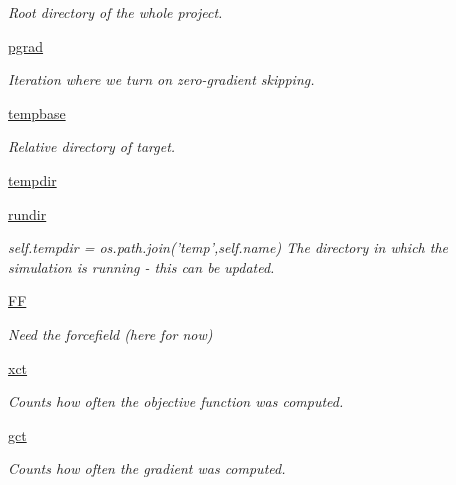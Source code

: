 \begin{DoxyCompactItemize}
\begin{DoxyCompactList}\small\item\em Root directory of the whole project. \end{DoxyCompactList}\item 
\hyperlink{classforcebalance_1_1target_1_1Target_a684235b4332b608c4e2da22982c2fdfa}{pgrad}
\begin{DoxyCompactList}\small\item\em Iteration where we turn on zero-\/gradient skipping. \end{DoxyCompactList}\item 
\hyperlink{classforcebalance_1_1target_1_1Target_ae5b544d3e11365865813ef3d626ef81d}{tempbase}
\begin{DoxyCompactList}\small\item\em Relative directory of target. \end{DoxyCompactList}\item 
\hyperlink{classforcebalance_1_1target_1_1Target_aa1f01b5b78db253b5b66384ed11ed193}{tempdir}
\item 
\hyperlink{classforcebalance_1_1target_1_1Target_a6872de5b2d4273b82336ea5b0da29c9e}{rundir}
\begin{DoxyCompactList}\small\item\em self.\-tempdir = os.\-path.\-join('temp',self.\-name) The directory in which the simulation is running -\/ this can be updated. \end{DoxyCompactList}\item 
\hyperlink{classforcebalance_1_1target_1_1Target_a38a37919783141ea37fdcf8b00ce0aaf}{F\-F}
\begin{DoxyCompactList}\small\item\em Need the forcefield (here for now) \end{DoxyCompactList}\item 
\hyperlink{classforcebalance_1_1target_1_1Target_aad2e385cfbf7b4a68f1c2cb41133fe82}{xct}
\begin{DoxyCompactList}\small\item\em Counts how often the objective function was computed. \end{DoxyCompactList}\item 
\hyperlink{classforcebalance_1_1target_1_1Target_aa625ac88c6744eb14ef281d9496d0dbb}{gct}
\begin{DoxyCompactList}\small\item\em Counts how often the gradient was computed. \end{DoxyCompactList}\item 

\end{DoxyCompactItemize}
